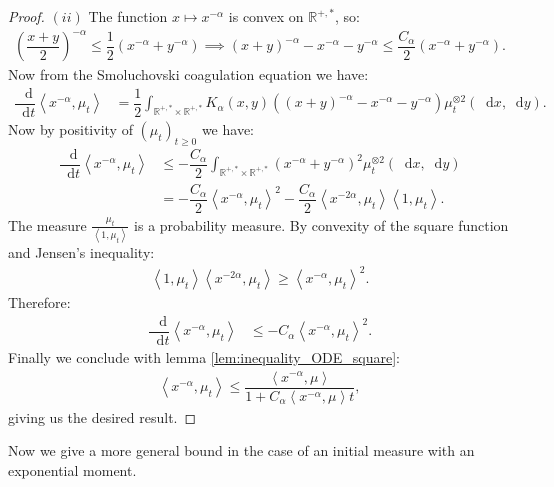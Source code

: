 \documentclass[11pt,a4paper]{article}
\newcommand{\RR}{\mathbb{R}}
\newcommand{\Proc}[1]{\left(#1\right)_{t\geq 0}}
\newcommand{\dd}{\mathop{}\!\mathrm{d}}
\begin{document}
\begin{proof}
    $(ii)$ The function $x \mapsto x^{-\alpha}$ is convex on $\RR^{+,*}$, so:
    \begin{align*}
        \left(\dfrac{x + y}{2}\right)^{-\alpha} \leq \dfrac{1}{2}  \left(x^{-\alpha} + y^{-\alpha}\right) \implies 
        \left(x + y\right)^{-\alpha} - x^{-\alpha} - y^{-\alpha} \leq \dfrac{C_\alpha}{2} \left( x^{-\alpha} + y^{-\alpha}\right).
    \end{align*}
    Now from the Smoluchovski coagulation equation we have:
    \begin{align*}
        \dfrac{\dd}{\dd t} \left\langle x^{-\alpha},\mu_t\right\rangle &= \dfrac12\int_{\RR^{+,*}\times \RR^{+,*}} K_\alpha(x,y) \left((x + y)^{-\alpha}- x^{-\alpha} - y^{-\alpha} \right) \mu_t^{\otimes 2}(\dd x, \dd y).
    \end{align*}
    Now by positivity of $\Proc{\mu_t}$ we have:
    \begin{align*}
        \dfrac{\dd}{\dd t} \left\langle x^{-\alpha},\mu_t\right\rangle &\leq -\dfrac{C_\alpha}{2}\int_{\RR^{+,*}\times \RR^{+,*}} \left(x^{-\alpha} + y^{-\alpha} \right)^2 \mu_t^{\otimes 2}(\dd x, \dd y)
        \\
        &= -\dfrac{C_\alpha}{2} \left\langle x^{-\alpha}, \mu_t\right\rangle^2 - \dfrac{C_\alpha}{2}\left\langle x^{-2\alpha}, \mu_t\right\rangle \left\langle 1, \mu_t\right\rangle.
    \end{align*}
   The measure $\frac{\mu_t}{\left\langle 1, \mu_t\right\rangle}$ is a probability measure. By convexity of the square function and Jensen's inequality:
   \begin{align*}
       \left\langle 1, \mu_t\right\rangle\left\langle x^{-2\alpha}, \mu_t\right\rangle \geq \left\langle x^{-\alpha}, \mu_t\right\rangle^2.
   \end{align*}
   Therefore:
    \begin{align*}
        \dfrac{\dd}{\dd t} \left\langle x^{-\alpha},\mu_t\right\rangle &\leq -C_\alpha \left\langle x^{-\alpha}, \mu_t\right\rangle^2.
    \end{align*}
    Finally we conclude with lemma \ref{lem:inequality_ODE_square}:
    \begin{align*}
        \left\langle x^{-\alpha},\mu_t\right\rangle \leq \dfrac{\left\langle x^{-\alpha}, \mu \right\rangle}{1 + C_\alpha\left\langle x^{-\alpha}, \mu \right\rangle t },
    \end{align*}
    giving us the desired result.
\end{proof}
Now we give a more general bound in the case of an initial measure with an exponential moment.
\end{document}
